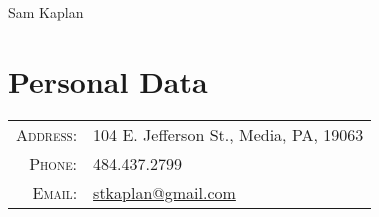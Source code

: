 \documentclass[a4paper,10pt]{article}
\begin{document}
\pagestyle{empty}  %

\par{\centering
    {\Huge Sam Kaplan}
\bigskip\par}

\section{Personal Data}
\begin{tabular}{rl}
    \textsc{Address:} & 104 E. Jefferson St., Media, PA, 19063 \\
    \textsc{Phone:}   & 484.437.2799 \\
    \textsc{Email:}   & \href{mailto:stkaplan@gmail.com}{stkaplan@gmail.com} \\
\end{tabular}
\end{document}
